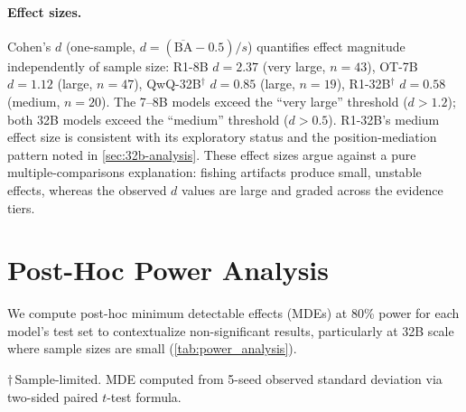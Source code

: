 \paragraph{Effect sizes.} Cohen's $d$ (one-sample, $d = (\overline{\text{BA}} - 0.5) / s$) quantifies effect magnitude independently of sample size: R1-8B $d{=}2.37$ (very large, $n{=}43$), OT-7B $d{=}1.12$ (large, $n{=}47$), QwQ-32B$^\dagger$ $d{=}0.85$ (large, $n{=}19$), R1-32B$^\dagger$ $d{=}0.58$ (medium, $n{=}20$). The 7--8B models exceed the ``very large'' threshold ($d{>}1.2$); both 32B models exceed the ``medium'' threshold ($d{>}0.5$). R1-32B's medium effect size is consistent with its exploratory status and the position-mediation pattern noted in \cref{sec:32b-analysis}. These effect sizes argue against a pure multiple-comparisons explanation: fishing artifacts produce small, unstable effects, whereas the observed $d$ values are large and graded across the evidence tiers.

\section{Post-Hoc Power Analysis}
\label{app:power_analysis}

We compute post-hoc minimum detectable effects (MDEs) at 80\% power for each model's test set to contextualize non-significant results, particularly at 32B scale where sample sizes are small (\cref{tab:power_analysis}).

\begin{table}[htbp]
\centering
\small
\caption{Post-hoc power analysis. MDE: minimum detectable effect (balanced accuracy, pp) at 80\% power given each model's test-set size and observed variance. Effects smaller than the MDE cannot be reliably detected.}
\label{tab:power_analysis}
\begin{flushleft}
\scriptsize $\dagger$\,Sample-limited. MDE computed from 5-seed observed standard deviation via two-sided paired $t$-test formula.
\end{flushleft}
\end{table}

